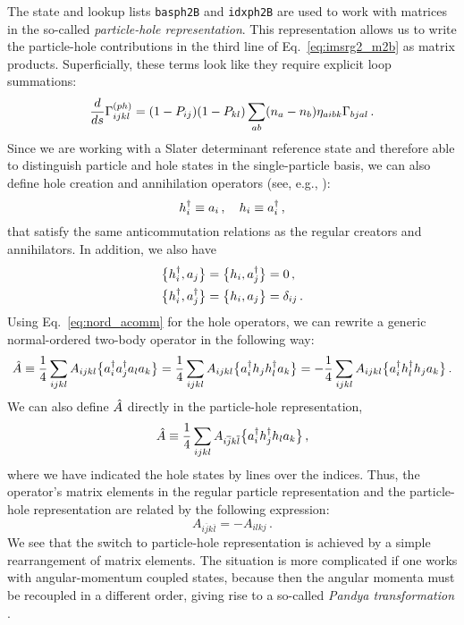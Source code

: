 {The state and lookup lists \texttt{basph2B} and \texttt{idxph2B} are used
to work with matrices in the so-called \emph{particle-hole representation}. 
This representation allows us to write the particle-hole contributions in
the third line of Eq.~\eqref{eq:imsrg2_m2b} as matrix products. Superficially,
these terms look like they require explicit loop summations:
\begin{equation}\label{eq:imsrg2_m2b_ph}
  \totd{}{s}\Gamma^{(ph)}_{ijkl}=(1-P_{ij})(1-P_{kl})\sum_{ab}(n_a-n_b)\eta_{aibk}\Gamma_{bjal}\,.
\end{equation}
Since we are working with a Slater determinant reference state and therefore
able to distinguish particle and hole states in the single-particle basis,
we can also define hole creation and annihilation operators (see, e.g., \cite{Suhonen:2007wo}):
\begin{equation}
  h^\dag_i \equiv a_i\,,\quad h_i \equiv a^\dag_i\,, 
\end{equation}
that satisfy the same anticommutation relations as the regular creators
and annihilators. In addition, we also have
\begin{align}
   \big\{ {h^\dag_i}, {a_j} \big\}   &=  \big\{ {h_i}, {a^\dag_j} \big\}  = 0\,,\notag\\
   \big\{ {h^\dag_i}, {a^\dag_j} \big\}  &=  \big\{ {h_i}, {a_j} \big\}  = \delta_{ij}\,.
\end{align}
Using Eq.~\eqref{eq:nord_acomm} for the hole operators, we can rewrite a 
generic normal-ordered two-body operator in the following way:
\begin{equation}
  \hat{A} \equiv \frac{1}{4}\sum_{ijkl}A_{ijkl}\big\{a^\dag_{i}a^\dag_{j}a_{l}a_{k}\big\}
    = \frac{1}{4}\sum_{ijkl}A_{ijkl}\big\{a^\dag_{i}h_{j}h^\dag_{l}a_{k}\big\}
    = -\frac{1}{4}\sum_{ijkl}A_{ijkl}\big\{a^\dag_{i}h^\dag_{l}h_{j}a_{k}\big\}\,.
\end{equation}
We can also define $\hat{A}$ directly in the particle-hole representation, 
\begin{equation}
   \hat{A} \equiv \frac{1}{4}\sum_{ijkl}A_{i\overline{j}k\overline{l}}\big\{a^\dag_{i}h^\dag_{j}h_{l}a_{k}\big\}\,,
\end{equation}
where we have indicated the hole states by lines over the indices. Thus,
the operator's matrix elements in the regular particle representation and 
the particle-hole representation are related by the following expression:
\begin{equation}
  A_{i\overline{j}k\overline{l}} = - A_{ilkj}\,.
\end{equation}
We see that the switch to particle-hole representation is achieved 
by a simple rearrangement of matrix elements. The situation is more 
complicated if one works with angular-momentum coupled states, because 
then the angular momenta must be recoupled in a different order, giving 
rise to a so-called \emph{Pandya transformation} 
\cite{Pandya:1956zv,Suhonen:2007wo,Kuo:1981fk}. 

}
